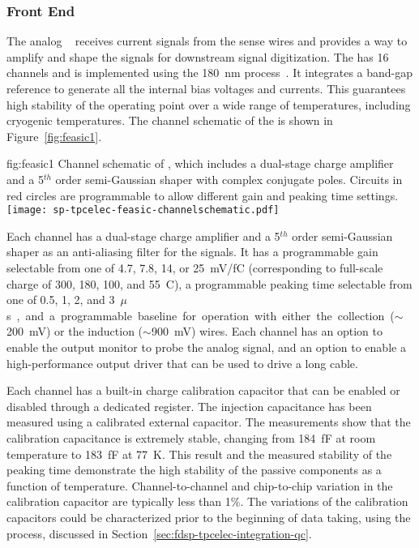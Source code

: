 \subsubsection{Front End }
\label{sec:fdsp-tpcelec-design-femb-fe}

The analog  ~\cite{DeGeronimo:2011zz} receives 
current signals from the  sense wires and provides a way to 
amplify and shape the signals for downstream signal digitization. 
The   has \num{16} channels and is implemented 
using the  \SI{180}{nm}  process~\cite{TSMC180}. It 
integrates a band-gap reference to generate all the internal bias 
voltages and currents. This guarantees high stability of the operating 
point over a wide range of temperatures, including cryogenic temperatures. 
The channel schematic of the   is shown in 
Figure~\ref{fig:feasic1}. 

\begin{dunefigure}
{fig:feasic1}
{Channel schematic of  , which includes a 
dual-stage charge amplifier and a \num{5}$^{th}$ order semi-Gaussian 
shaper with complex conjugate poles. Circuits in red circles are 
programmable to allow different gain and peaking time settings.}
\texttt{[image: sp-tpcelec-feasic-channelschematic.pdf]}
\end{dunefigure}

Each   channel has a dual-stage charge amplifier 
and a \num{5}$^{th}$ order semi-Gaussian shaper as an anti-aliasing 
filter for the  signals. It has a programmable gain 
selectable from one of \num{4.7}, \num{7.8}, \num{14}, or \SI{25}{mV/fC}
(corresponding to full-scale charge of \num{300}, \num{180}, \num{100}, 
and \SI{55}{C}), a programmable peaking time selectable from one of 
\num{0.5}, \num{1}, \num{2}, and \SI{3}{$\mu$s}, and a programmable 
baseline for operation with either the collection ($\sim$\SI{200}{mV}) 
or the induction ($\sim$\SI{900}{mV}) wires. Each channel has an 
option to enable the output monitor to probe the analog signal, and 
an option to enable a high-performance output driver that can be 
used to drive a long cable. 

Each   channel has a built-in charge calibration 
capacitor that can be enabled or disabled through a dedicated register. 
The injection capacitance has been measured using a calibrated external 
capacitor. The measurements show that the calibration capacitance is 
extremely stable, changing from \SI{184}{fF} at room temperature to 
\SI{183}{fF} at \SI{77}{K}. This result and the measured stability of 
the peaking time demonstrate the high stability of the passive 
components as a function of temperature. Channel-to-channel and 
chip-to-chip variation in the calibration capacitor are typically 
less than \num{1}\%. The variations of the calibration capacitors
could be characterized prior to the beginning of 
data taking, using the  process, discussed in
Section~\ref{sec:fdsp-tpcelec-integration-qc}.


